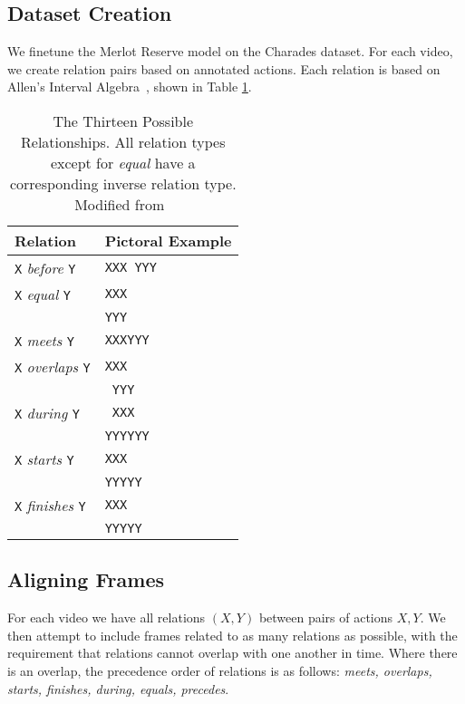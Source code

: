 \subsection{Dataset Creation}
\label{sec:data}

We finetune the Merlot Reserve model on the Charades dataset. For each video,
we create relation pairs based on annotated actions. Each relation is based on
Allen's Interval Algebra~\citep{allen1983interval}, shown in Table
\ref{tab:allen_interval}.

\begin{table}[htpb]
	\centering
	\caption{The Thirteen Possible Relationships. All relation types except for
		\textit{equal} have a corresponding inverse relation type. Modified
		from~\cite{allen1983interval}}
	\label{tab:allen_interval}
	\begin{tabular}{ll}
	Relation & Pictoral Example \\
	\hline
	\texttt{X} \textit{before} \texttt{Y} & \texttt{XXX YYY} \\
	\texttt{X} \textit{equal} \texttt{Y} & \texttt{XXX} \\
					   & \texttt{YYY} \\
	\texttt{X} \textit{meets} \texttt{Y} & \texttt{XXXYYY} \\
	\texttt{X} \textit{overlaps} \texttt{Y} & \texttt{XXX} \\
						& \texttt{ YYY} \\
	\texttt{X} \textit{during} \texttt{Y} & \texttt{ XXX} \\
						& \texttt{YYYYYY} \\
	\texttt{X} \textit{starts} \texttt{Y} & \texttt{XXX} \\
						& \texttt{YYYYY} \\
	\texttt{X} \textit{finishes} \texttt{Y} & \texttt{\space\space XXX} \\
							& \texttt{YYYYY} \\
	\end{tabular}
\end{table}

\subsection{Aligning Frames}

For each video we have all relations $(X, Y)$ between pairs of actions $X, Y$.
We then attempt to include frames related to as many relations as possible,
with the requirement that relations cannot overlap with one another in time.
Where there is an overlap, the precedence order of relations is as follows: \textit{meets,
overlaps, starts, finishes, during, equals, precedes}. %

